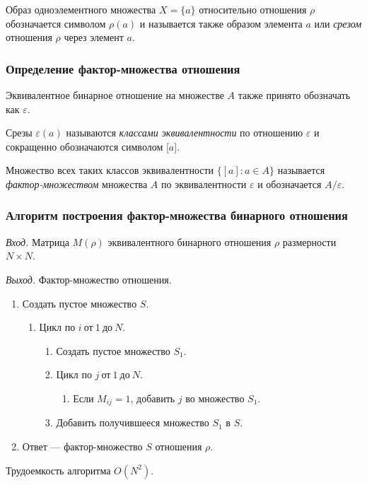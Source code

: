\documentclass[bachelor, och, labwork]{shiza}
\begin{document}
Образ одноэлементного множества $X=\{a\}$ относительно отношения $\rho$
обозначается символом $\rho(a)$ и называется также образом элемента $a$ или
\textit{срезом} отношения $\rho$ через элемент $a$.

\subsubsection{Определение фактор-множества отношения}

Эквивалентное бинарное отношение на множестве $A$ также принято обозначать как
$\varepsilon$.

Срезы $\varepsilon(a)$ называются \textit{классами эквивалентности} по отношению
$\varepsilon$ и сокращенно обозначаются символом [$a$].

Множество всех таких классов эквивалентности $\{[a]:a\in A\}$ называется 
\textit{фактор-множеством} множества $A$ по эквивалентности $\varepsilon$ и 
обозначается $A/\varepsilon$.

\subsubsection{Алгоритм построения фактор-множества бинарного отношения}

\textit{Вход.} Матрица $M(\rho)$ эквивалентного бинарного отношения $\rho$ размерности
$N \times N$.

\textit{Выход.} Фактор-множество отношения.

\begin{enumerate}
    \item Создать пустое множество $S$.
    \begin{enumerate}[label=a)]
        \item Цикл по $i ~\text{от}~ 1 ~\text{до}~ N$.
            \begin{enumerate} 
                \item Создать пустое множество $S_1$.
                \item Цикл по $j ~\text{от}~ 1 ~\text{до}~ N$.
                    \begin{enumerate}[label=1.]\item Если $M_{ij} = 1$, добавить $j$ во множество $S_1$.\end{enumerate}
                \item Добавить получившееся множество $S_1$ в $S$.
            \end{enumerate}
    \end{enumerate}
    \item Ответ --- фактор-множество $S$ отношения $\rho$.
\end{enumerate}
    Трудоемкость алгоритма $O(N^2)$.
\end{document}

